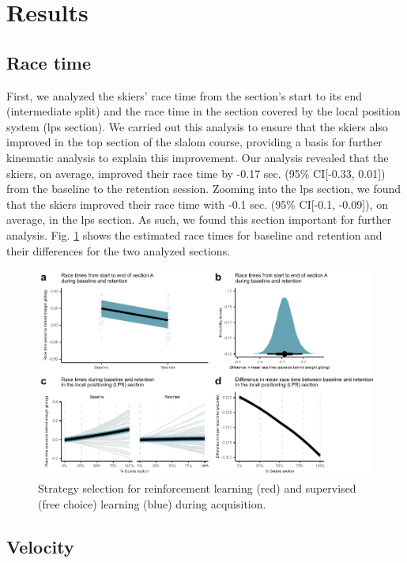 \documentclass{article}
\begin{document}
\section{Results}



\subsection{Race time}
First, we analyzed the skiers' race time from the section's start to its end (intermediate split) and the race time in the section covered by the local position system (lps section). We carried out this analysis to ensure that the skiers also improved in the top section of the slalom course, providing a basis for further kinematic analysis to explain this improvement. Our analysis revealed that the skiers, on average, improved their race time by -0.17 sec. (95\% CI[-0.33, 0.01]) from the baseline to the retention session. Zooming into the lps section, we found that the skiers improved their race time with -0.1 sec. (95\% CI[-0.1, -0.09]), on average, in the lps section. As such, we found this section important for further analysis. Fig. \ref{fig: choice_estimated} shows the estimated race times for baseline and retention and their differences for the two analyzed sections. 

\begin{figure}[H]
\centering
\includegraphics{figurer/figure_racetime.pdf}
\caption{Strategy selection for reinforcement learning (red) and supervised (free choice) learning (blue) during acquisition.}\label{fig: choice_estimated}
\end{figure}

\subsection{Velocity}
\end{document}
